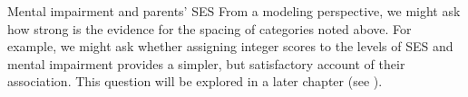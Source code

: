 \begin{Example}[mental1]{Mental impairment and parents' SES}
From a modeling perspective,  we might ask how strong is the evidence
for the spacing of categories noted above.  For example, we might
ask whether assigning integer scores to the levels of SES and mental
impairment provides a simpler, but satisfactory account of their association.
This question will be explored in a later chapter (see ).
\end{Example}
